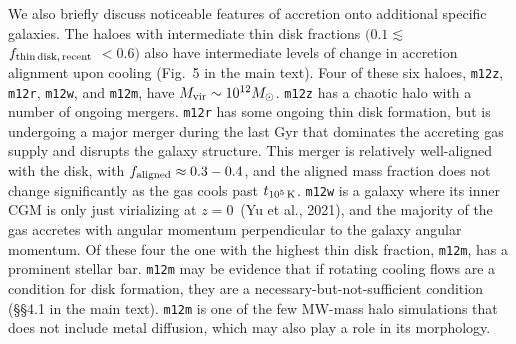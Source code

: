 \documentclass[class=article, crop=false]{standalone}
\newcommand{\fthin}{f_{\rm thin\,disk,\,recent}}
\newcommand{\tcools}{t_{10^5\,{\rm K}}}
\begin{document}
We also briefly discuss noticeable features of accretion onto additional specific galaxies.
The haloes with intermediate thin disk fractions $(0.1 \lesssim$ \\ $\fthin$ $< 0.6)$ also have intermediate levels of change in accretion alignment upon cooling (Fig.~5 in the main text). 
Four of these six haloes, \texttt{m12z}, \texttt{m12r}, \texttt{m12w}, and \texttt{m12m}, have $M_{\rm vir} \sim 10^{12} M_\odot$.
\texttt{m12z} has a chaotic halo with a number of ongoing mergers.
\texttt{m12r} has some ongoing thin disk formation, but is undergoing a major merger during the last Gyr that dominates the accreting gas supply and disrupts the galaxy structure.
This merger is relatively well-aligned with the disk, with $f_{\rm aligned} \approx 0.3-0.4$, and the aligned mass fraction does not change significantly as the gas cools past $\tcools$.
\texttt{m12w} is a galaxy where its inner CGM is only just virializing at $z=0$~(Yu et al., 2021), and the majority of the gas accretes with angular momentum perpendicular to the galaxy angular momentum.
Of these four the one with the highest thin disk fraction, \texttt{m12m}, 
has a prominent stellar bar.
\texttt{m12m} may be evidence that if rotating cooling flows are a condition for disk formation, they are a necessary-but-not-sufficient condition (\S\S4.1 in the main text).
\texttt{m12m} is one of the few MW-mass halo simulations that does not include metal diffusion, which may also play a role in its morphology.


\end{document}
